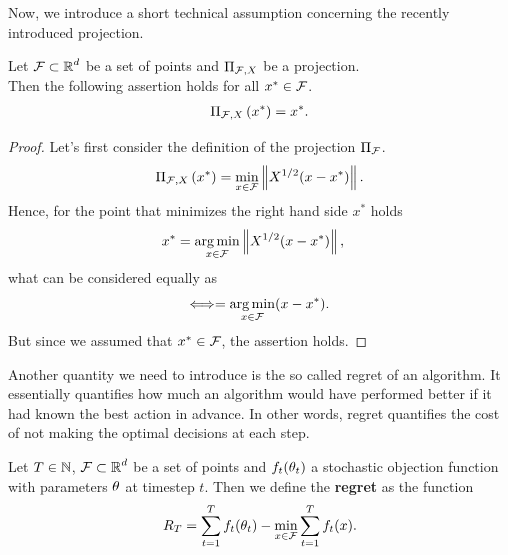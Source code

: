 Now, we introduce a short technical assumption concerning the recently introduced projection.

\begin{lemma}
Let $\operatorname{\mathcal{F}}\subset\operatorname{\mathbb{R}}^d$ be a set of points and $\Pi_{\operatorname{\mathcal{F}}, X}$ be a projection.\\
Then the following assertion holds for all $x^{\ast}\in \operatorname{\mathcal{F}}$.
\begin{align*}
\Pi_{\operatorname{\mathcal{F}}, X} \left(x^{\ast}\right) = x^{\ast}.
\end{align*}
\end{lemma}

\begin{proof}
Let's first consider the definition of the projection $\Pi_{\operatorname{\mathcal{F}}}$.
\begin{align*}
\Pi_{\operatorname{\mathcal{F}}, X} \left(x^{\ast}\right) = \min_{x\in\operatorname{\mathcal{F}}} \left\|X^{1/2}(x - x^{\ast}) \right\|.
\end{align*}
Hence, for the point that minimizes the right hand side $x^{\ast}$ holds
\begin{align*}
x^{\ast}& = \operatorname*{arg\,min}_{x\in\operatorname{\mathcal{F}}}\left\|X^{1/2}(x - x^{\ast}) \right\|,
\end{align*}
what can be considered equally as
\begin{align*}
\Longleftrightarrow = \operatorname*{arg\,min}_{x\in\operatorname{\mathcal{F}}}(x - x^{\ast}).
\end{align*}
But since we assumed that $x^{\ast}\in\operatorname{\mathcal{F}}$, the assertion holds.
\end{proof}

Another quantity we need to introduce is the so called regret of an algorithm. It essentially quantifies how much an algorithm would have performed better if it had known the best action in advance. In other words, regret quantifies the cost of not making the optimal decisions at each step.

\begin{definition}\label{def:regret}
Let $T\in \operatorname{\mathbb{N}}$, $\operatorname{\mathcal{F}}\subset\operatorname{\mathbb{R}}^d$ be a set of points and $f_t(\theta_t)$ a stochastic objection function with parameters $\theta$ at timestep $t$. Then we define the \textbf{regret} as the function
\begin{align*}
R_T = \sum_{t=1}^Tf_t(\theta_t) - \min_{x\in\operatorname{\mathcal{F}}} \sum_{t=1}^Tf_t(x).
\end{align*}
\end{definition}

